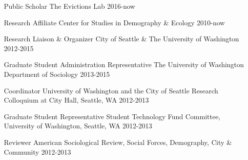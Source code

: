 



\begin{cvhonors}

  \cvhonor
    {Public Scholar} %
    {The Evictions Lab} %
    {} %
    {2016-now} %

  \cvhonor
    {Research Affiliate} %
    {Center for Studies in Demography \& Ecology} %
    {} %
    {2010-now} %

  \cvhonor
    {Research Liaison \& Organizer} %
    {City of Seattle \& The University of Washington} %
    {} %
    {2012-2015} %

  \cvhonor
    {Graduate Student Administration Representative} %
    {The University of Washington Department of Sociology} %
    {} %
    {2013-2015} %

  \cvhonor
    {Coordinator} %
    {University of Washington and the City of Seattle Research Colloquium at City Hall, Seattle, WA} %
    {} %
    {2012-2013} %

  \cvhonor
    {Graduate Student Representative} %
    {Student Technology Fund Committee, University of Washington, Seattle, WA} %
    {} %
    {2012-2013} %

  \cvhonor
    {Reviewer} %
    {American Sociological Review, Social Forces, Demography, City \& Community} %
    {} %
    {2012-2013} %
    
\end{cvhonors}

